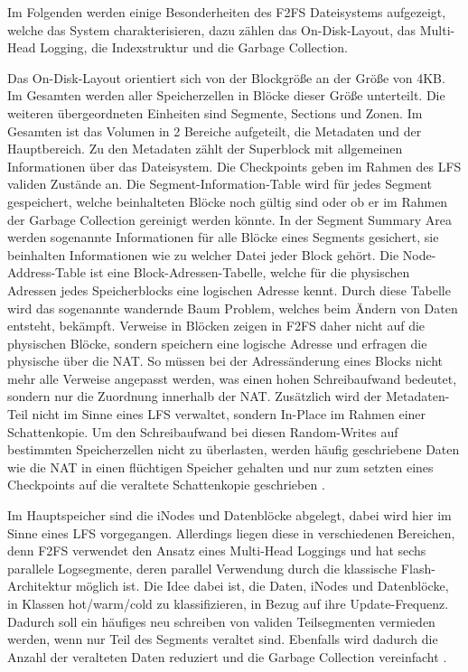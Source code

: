 \documentclass[11pt]{article}
\begin{document}
Im Folgenden werden einige Besonderheiten des F2FS Dateisystems aufgezeigt, welche das System charakterisieren, dazu zählen das On-Disk-Layout, das Multi-Head Logging, die Indexstruktur und die Garbage Collection.

Das On-Disk-Layout orientiert sich von der Blockgröße an der Größe von 4KB. Im Gesamten werden aller Speicherzellen in Blöcke dieser Größe unterteilt. Die weiteren übergeordneten Einheiten sind Segmente, Sections und Zonen. Im Gesamten ist das Volumen in 2 Bereiche aufgeteilt, die Metadaten und der Hauptbereich. Zu den Metadaten zählt der Superblock mit allgemeinen Informationen über das Dateisystem.
Die Checkpoints geben im Rahmen des LFS validen Zustände an.
Die Segment-Information-Table wird für jedes Segment gespeichert, welche beinhalteten Blöcke noch gültig sind oder ob er im Rahmen der Garbage Collection gereinigt werden könnte.
In der Segment Summary Area werden sogenannte Informationen für alle Blöcke eines Segments gesichert, sie beinhalten Informationen wie zu welcher Datei jeder Block gehört.
Die Node-Address-Table ist eine Block-Adressen-Tabelle, welche für die physischen Adressen jedes Speicherblocks eine logischen Adresse kennt. Durch diese Tabelle wird das sogenannte wandernde Baum Problem, welches beim Ändern von Daten entsteht, bekämpft. Verweise in Blöcken zeigen in F2FS daher nicht auf die physischen Blöcke, sondern speichern eine logische Adresse und erfragen die physische über die NAT. So müssen bei der Adressänderung eines Blocks nicht mehr alle Verweise angepasst werden, was einen hohen Schreibaufwand bedeutet, sondern nur die Zuordnung innerhalb der NAT. Zusätzlich wird der Metadaten-Teil nicht im Sinne eines LFS verwaltet, sondern In-Place im Rahmen einer Schattenkopie. Um den Schreibaufwand bei diesen Random-Writes auf bestimmten Speicherzellen nicht zu überlasten, werden häufig geschriebene Daten wie die NAT in einen flüchtigen Speicher gehalten und nur zum setzten eines Checkpoints auf die veraltete Schattenkopie geschrieben \cite{lee2015f2fs}.

Im Hauptspeicher sind die iNodes und Datenblöcke abgelegt, dabei wird hier im Sinne eines LFS vorgegangen. Allerdings liegen diese in verschiedenen Bereichen, denn F2FS verwendet den Ansatz eines Multi-Head Loggings und hat sechs parallele Logsegmente, deren parallel Verwendung durch die klassische Flash-Architektur möglich ist. Die Idee dabei ist, die Daten, iNodes und Datenblöcke, in Klassen hot/warm/cold zu klassifizieren, in Bezug auf ihre Update-Frequenz. Dadurch soll ein häufiges neu schreiben von validen Teilsegmenten vermieden werden, wenn nur Teil des Segments veraltet sind. Ebenfalls wird dadurch die Anzahl der veralteten Daten reduziert und die Garbage Collection vereinfacht \cite{lee2015f2fs}.
\end{document}
